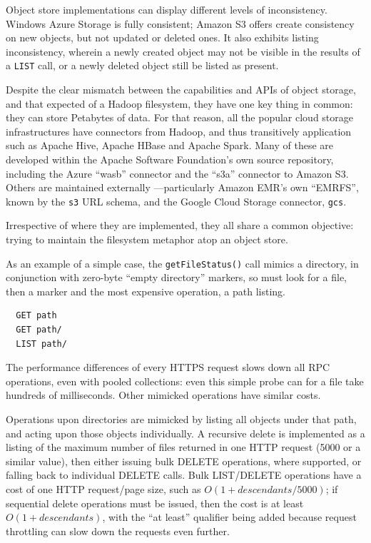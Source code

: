 \documentclass[conference]{IEEEtran}
\begin{document}
Object store implementations can display different levels of inconsistency.
Windows Azure Storage is fully consistent;
Amazon S3 offers create consistency on new objects, but not updated or deleted ones.
It also exhibits listing inconsistency, wherein a newly created object
may not be visible in the results of a \texttt{LIST} call, or a newly deleted
object still be listed as present.


Despite the clear mismatch between the capabilities and APIs of object storage,
and that expected of a Hadoop filesystem, they have one key thing in common:
they can store Petabytes of data.
For that reason, all the popular cloud storage infrastructures have connectors
from Hadoop, and thus transitively application such as Apache Hive, Apache HBase
and Apache Spark.
Many of these are developed within the Apache Software Foundation's own
source repository, including the Azure ``wasb'' connector and the ``s3a'' connector
to Amazon S3.
Others are maintained externally ---particularly Amazon EMR's own ``EMRFS'',
known by the \texttt{s3} URL schema, and the Google Cloud Storage connector,
\texttt{gcs}.

Irrespective of where they are implemented, they all share a common objective:
trying to maintain the filesystem metaphor atop an object store.

As an example of a simple case, the \texttt{getFileStatus()} call mimics
a directory, in conjunction with zero-byte ``empty directory'' markers,
so must look for a file, then a marker and the most expensive operation, a path listing.

\begin{verbatim}
  GET path
  GET path/
  LIST path/
\end{verbatim}

The performance differences of every HTTPS request slows
down all RPC operations, even with pooled collections: even this simple probe
can for a file take hundreds of milliseconds.
Other mimicked operations have similar costs.

Operations upon directories are mimicked by listing all objects under that path,
and acting upon those objects individually.
A recursive delete is implemented as a listing of the maximum number of files
returned in one HTTP request (5000 or a similar value), then either issuing
bulk DELETE operations, where supported, or falling back to individual DELETE
calls.
Bulk LIST/DELETE operations have a cost of one HTTP request/page size, such
as $O(1 + descendants/5000)$; if sequential delete operations must be issued, then
the cost is at least $O(1+ descendants)$, with the ``at least'' qualifier being
added because request throttling can slow down the requests even further.
\end{document}
